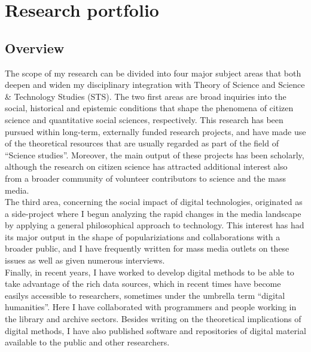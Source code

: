 \documentclass[a4paper,11pt,oneside]{article}
\begin{document}


\renewcommand{\thesection}{\arabic{section}}
\clearpage
\newpage
\setlength\parindent{0cm}
\section{Research portfolio}

    \subsection{Overview}
    The scope of my research can be divided into four major subject areas that both
    deepen and widen my disciplinary integration with Theory of Science and Science \&
    Technology Studies (STS). The two first areas are broad inquiries into the social,
    historical and epistemic conditions that shape the phenomena of citizen science and quantitative
    social sciences, respectively. This research has been pursued within long-term,
    externally funded research projects, and have made use of the theoretical resources
    that are usually regarded as part of the field of ``Science studies''. Moreover, the main
    output of these projects has been scholarly, although the research on citizen
    science has attracted additional interest also from a broader community of volunteer
    contributors to science and the mass media.\\

    The third area, concerning the social impact of digital technologies, originated as a
    side-project where I begun analyzing the rapid changes in the media landscape
    by applying a general philosophical approach to technology. This interest has
    had its major output in the shape of populariziations and collaborations with
    a broader public, and I have frequently written for mass media outlets on these
    issues as well as given numerous interviews.\\

    Finally, in recent years, I have worked to develop digital methods to be able to
    take advantage of the rich data sources, which in recent times have become
    easilys accessible to researchers, sometimes under the umbrella term ``digital humanities''.
    Here I have collaborated with programmers and people working in the library and
    archive sectors. Besides writing on the theoretical implications
    of digital methods, I have also published software and repositories of digital
    material available to the public and other researchers.\\
\end{document}
